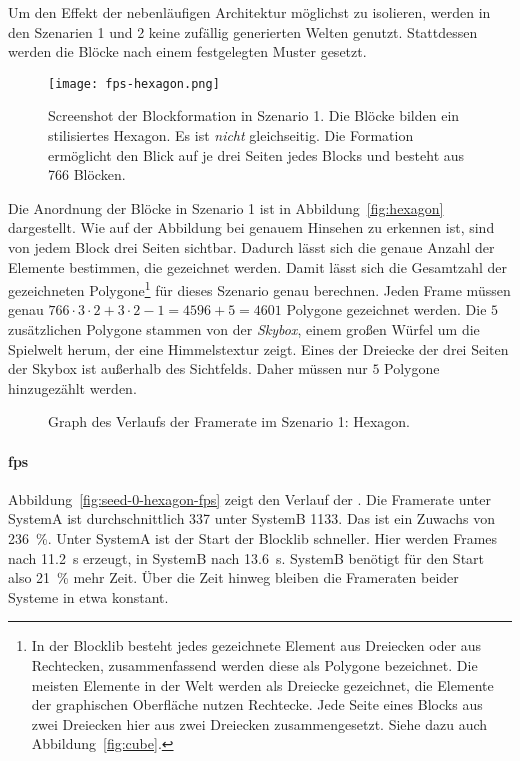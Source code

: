 
Um den Effekt der nebenläufigen Architektur möglichst zu isolieren, werden in den Szenarien 1 und 2 keine zufällig generierten Welten genutzt. Stattdessen werden die Blöcke nach einem festgelegten Muster gesetzt.

\begin{figure}
	\centering
	\texttt{[image: fps-hexagon.png]}
	\caption[Screenshot der Blockformation in Szenario 1 der Performanceanalyse.]{Screenshot der Blockformation in Szenario 1. Die Blöcke bilden ein stilisiertes Hexagon. Es ist \emph{nicht} gleichseitig. Die Formation ermöglicht den Blick auf je drei Seiten jedes Blocks und besteht aus 766 Blöcken.}\label{fig:hexagon}
\end{figure}
Die Anordnung der Blöcke in Szenario 1 ist in Abbildung~\vref{fig:hexagon} dargestellt. Wie auf der Abbildung bei genauem Hinsehen zu erkennen ist, sind von jedem Block drei Seiten sichtbar. Dadurch lässt sich die genaue Anzahl der Elemente bestimmen, die gezeichnet werden. Damit lässt sich die Gesamtzahl der gezeichneten Polygone\footnote{In der Blocklib besteht jedes gezeichnete Element aus Dreiecken oder aus Rechtecken, zusammenfassend werden diese als Polygone bezeichnet. Die meisten Elemente in der Welt werden als Dreiecke gezeichnet, die Elemente der graphischen Oberfläche nutzen Rechtecke. Jede Seite eines Blocks aus zwei Dreiecken hier aus zwei Dreiecken zusammengesetzt. Siehe dazu auch Abbildung~\vref{fig:cube}.} für dieses Szenario genau berechnen. Jeden Frame müssen genau $766\cdot3\cdot2 + 3\cdot2-1 = 4596 +5 = 4601$ Polygone gezeichnet werden. Die $5$ zusätzlichen Polygone stammen von der \emph{Skybox}, einem großen Würfel um die Spielwelt herum, der eine Himmelstextur zeigt. Eines der Dreiecke der drei Seiten der Skybox ist außerhalb des Sichtfelds. Daher müssen nur $5$ Polygone hinzugezählt werden.

\begin{figure}[!htbp]
	\settowidth{}
	\caption[Graph des Verlaufs der Framerate in Szenario 1: Hexagon.]{Graph des Verlaufs der Framerate im Szenario 1: Hexagon.}\label{fig:seed-0-hexagon-fps}
\end{figure}
\paragraph{\ac{fps}} Abbildung~\vref{fig:seed-0-hexagon-fps} zeigt den Verlauf der \si{\fps}. Die Framerate unter SystemA ist durchschnittlich \SI{337}{\fps} unter SystemB \SI{1133}{\fps}. Das ist ein Zuwachs von \SI{236}{\percent}. Unter SystemA ist der Start der Blocklib schneller. Hier werden Frames nach \SI{11,2}{\second} erzeugt, in SystemB nach \SI{13,6}{\second}. SystemB benötigt für den Start also \SI{21}{\percent} mehr Zeit. Über die Zeit hinweg bleiben die Frameraten beider Systeme in etwa konstant.


